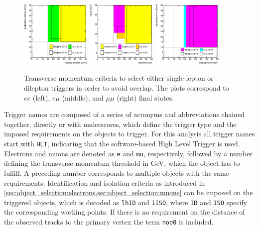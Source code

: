 \begin{figure}[htb]
    \centering
        \includegraphics[width=0.3\textwidth]{./figures/event_selection/triggers_ee.eps}
        \includegraphics[width=0.3\textwidth]{./figures/event_selection/triggers_emu.eps}
        \includegraphics[width=0.3\textwidth]{./figures/event_selection/triggers_mumu.eps}
        \caption{Transverse momentum criteria to select either single-lepton or dilepton triggers in order to avoid overlap.
        The plots correspond to $ee$ (left), $e\mu$ (middle), and $\mu\mu$ (right) final states.~\cite{TauConfNote}}\label{fig:event_selection:triggers}
\end{figure}

Trigger names are composed of a series of acronyms and abbreviations chained together, directly or with underscores,
which define the trigger type and the imposed requirements on the objects to trigger.
For this analysis all trigger names start with \texttt{HLT}, indicating that the software-based High Level Trigger
is used.
Electrons and muons are denoted  as \texttt{e} and \texttt{mu}, respectively, followed by a number defining the transverse
momentum threshold in GeV, which the object has to fulfill.
A preceding number corresponds to multiple objects with the same requirements.
Identification and isolation criteria as introduced in \cref{sec:object_selection:electrons,sec:object_selection:muons}
can be imposed on the triggered objects, which is decoded as \texttt{lhID}
and \texttt{iISO}, where \texttt{ID} and \texttt{ISO} specify the corresponding working points.
If there is no requirement on the distance of the observed tracks to the primary vertex the term \texttt{nod0}
is included.

